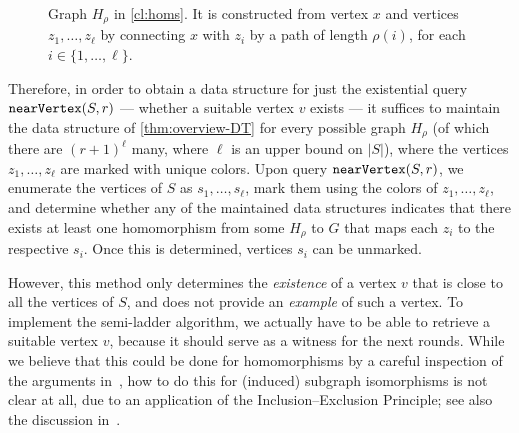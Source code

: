 \begin{figure}
	\centering
	\caption{Graph $H_\rho$ in \cref{cl:homs}. It is constructed from  vertex $x$ and vertices $z_1,\ldots,z_\ell$ by connecting $x$ with $z_i$ by a path of length $\rho(i)$, for each $i\in \{1,\ldots,\ell\}$.}\label{fig:homs}
\end{figure}

Therefore, in order to obtain a data structure for just the existential query $\mathtt{nearVertex}(S,r)$ --- whether a suitable vertex $v$ exists --- it suffices to maintain the data structure of \cref{thm:overview-DT} for every possible graph $H_\rho$ (of which there are $(r+1)^\ell$ many, where $\ell$ is an upper bound on $|S|$), where the vertices $z_1,\ldots,z_\ell$ are marked with unique colors. Upon query $\mathtt{nearVertex}(S,r)$, we enumerate the vertices of $S$ as $s_1,\ldots,s_\ell$, mark them using the colors of $z_1,\ldots,z_\ell$, and determine whether any of the maintained data structures indicates that there exists at least one homomorphism from some $H_\rho$ to $G$ that maps each $z_i$ to the respective $s_i$. Once this is determined, vertices $s_i$ can be unmarked.

However, this method only determines the \emph{existence} of a vertex $v$ that is close to all the vertices of $S$, and does not provide an \emph{example} of such a vertex. To implement the semi-ladder algorithm, we actually have to be able to retrieve a suitable vertex $v$, because it should serve as a witness for the next rounds. While we believe that this could be done for homomorphisms by a careful inspection of the arguments in~\cite{DvorakT13}, how to do this for (induced) subgraph isomorphisms is not clear at all, due to an application of the Inclusion--Exclusion Principle; see also the discussion in~\cite[Section~9]{DvorakT13}.


